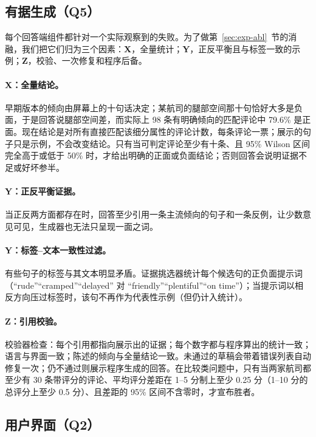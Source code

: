 \documentclass[10pt,twocolumn,a4paper]{article}
\newcommand{\sref}[1]{第~\ref{#1}~节}
\begin{document}
\subsection{有据生成（Q5）}
\label{sec:gen}

每个回答端组件都针对一个实际观察到的失败。为了做\sref{sec:exp-abl}的消融，我们把它们归为三个因素：\textbf{X}，全量统计；\textbf{Y}，正反平衡且与标签一致的示例；\textbf{Z}，校验、一次修复和程序后备。

\paragraph{X：全量结论。}早期版本的倾向由屏幕上的十句话决定；某航司的腿部空间那十句恰好大多是负面，于是回答说腿部空间差，而实际上 98 条有明确倾向的匹配评论中 79.6\% 是正面。现在结论是对所有直接匹配该细分属性的评论计数，每条评论一票；展示的句子只是示例，不会改变结论。只有当可判定评论至少有十条、且 95\% Wilson 区间完全高于或低于 50\% 时，才给出明确的正面或负面结论；否则回答会说明证据不足或好坏参半。

\paragraph{Y：正反平衡证据。}当正反两方面都存在时，回答至少引用一条主流倾向的句子和一条反例，让少数意见可见，生成器也无法只呈现一面之词。

\paragraph{Y：标签--文本一致性过滤。}有些句子的标签与其文本明显矛盾。证据挑选器统计每个候选句的正负面提示词（“rude”“cramped”“delayed” 对 “friendly”“plentiful”“on time”）；当提示词以相反方向压过标签时，该句不再作为代表性示例（但仍计入统计）。

\paragraph{Z：引用校验。}校验器检查：每个引用都指向展示出的证据；每个数字都与程序算出的统计一致；语言与界面一致；陈述的倾向与全量结论一致。未通过的草稿会带着错误列表自动修复一次；仍不通过则展示程序生成的回答。在比较类问题中，只有当两家航司都至少有 30 条带评分的评论、平均评分差距在 1--5 分制上至少 0.25 分（1--10 分的总评分上至少 0.5 分）、且差距的 95\% 区间不含零时，才宣布胜者。

\subsection{用户界面（Q2）}
\label{sec:ui}
\end{document}
